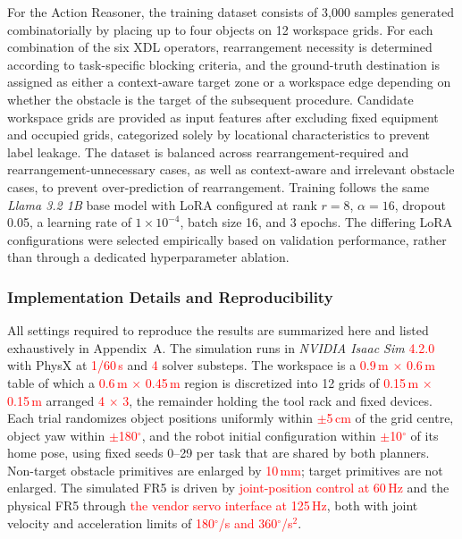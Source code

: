 \documentclass{ieeeaccess}
\newif\ifhighlight
\newcommand{\rev}[1]{\ifhighlight\hl{#1}\else#1\fi}
\newcommand{\nd}[1]{\textcolor{red}{#1}}
\begin{document}
For the Action Reasoner, the training dataset consists of 3,000 samples generated combinatorially by placing up to four objects on 12 workspace grids. For each combination of the six XDL operators, rearrangement necessity is determined according to task-specific blocking criteria, and the ground-truth destination is assigned as either a context-aware target zone or a workspace edge depending on whether the obstacle is the target of the subsequent procedure. Candidate workspace grids are provided as input features after excluding fixed equipment and occupied grids, categorized solely by locational characteristics to prevent label leakage. The dataset is balanced across rearrangement-required and rearrangement-unnecessary cases, as well as context-aware and irrelevant obstacle cases, to prevent over-prediction of rearrangement. Training follows the same \textit{Llama 3.2 1B} base model with LoRA configured at rank $r = 8$, $\alpha = 16$, dropout 0.05, a learning rate of $1 \times 10^{-4}$, batch size 16, and 3 epochs. The differing LoRA configurations were selected empirically based on validation performance, rather than through a dedicated hyperparameter ablation.



\subsubsection{Implementation Details and Reproducibility}\label{sec:4.1.4}
\rev{All settings required to reproduce the results are summarized here and listed exhaustively in Appendix~A.
The simulation runs in \textit{NVIDIA Isaac Sim} \nd{4.2.0} with PhysX at \nd{1/60\,s} and \nd{4} solver substeps.
The workspace is a \nd{0.9\,m $\times$ 0.6\,m} table of which a \nd{0.6\,m $\times$ 0.45\,m} region is discretized into 12 grids of \nd{0.15\,m $\times$ 0.15\,m} arranged \nd{4 $\times$ 3}, the remainder holding the tool rack and fixed devices.
Each trial randomizes object positions uniformly within \nd{$\pm$5\,cm} of the grid centre, object yaw within \nd{$\pm$180$^\circ$}, and the robot initial configuration within \nd{$\pm$10$^\circ$} of its home pose, using fixed seeds 0--29 per task that are shared by both planners.
Non-target obstacle primitives are enlarged by \nd{10\,mm}; target primitives are not enlarged.
The simulated FR5 is driven by \nd{joint-position control at 60\,Hz} and the physical FR5 through \nd{the vendor servo interface at 125\,Hz}, both with joint velocity and acceleration limits of \nd{180$^\circ$/s and 360$^\circ$/s$^2$}.}
\end{document}
